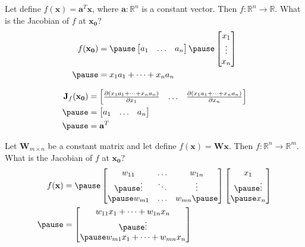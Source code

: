 \documentclass[12pt,aspectratio=169]{beamer}
\renewcommand{\Re}{\mathbb{R}}
\begin{document}
\begin{frame}
Let define $f(\mathbf{x})=\mathbf{a}^T\mathbf{x}$, where $\mathbf{a}:\Re^n$ is a constant vector. Then $f:\Re^n\to \Re$. What is the Jacobian of $f$ at $\mathbf{x_0}$?\pause
\[
\begin{aligned}
f(\mathbf{x_0})&=\pause
\begin{bmatrix}
a_1 & \dots & a_n
\end{bmatrix}\pause
\begin{bmatrix}
x_1 \\
\vdots\\
x_n
\end{bmatrix}\\ \pause
&=x_1a_1+\dots +x_na_n
\end{aligned}
\]
\end{frame}


\begin{frame}
\[
\begin{aligned}
\mathbf{J}_f(\mathbf{x_0})&=
\begin{bmatrix}
\frac{\partial (x_1a_1+\dots + x_na_n)}{\partial x_1} & \dots & \frac{\partial (x_1a_1+\dots + x_na_n)}{\partial x_n}\\ 
\end{bmatrix}\\ \pause
&=\begin{bmatrix}
a_1 & \dots & a_n
\end{bmatrix}\\ \pause
&=\mathbf{a}^T
\end{aligned}
\]
\end{frame}

\begin{frame}
Let $\mathbf{W}_{m\times n}$ be a constant matrix and let define $f(\mathbf{x})=\mathbf{W}\mathbf{x}$. Then $f:\Re^n\to \Re^m$. What is the Jacobian of $f$ at $\mathbf{x_0}$?
\[
\begin{aligned}
f(\mathbf{x})&=\pause\begin{bmatrix}
w_{11} & \dots & w_{1n}\\ \pause
\vdots & \ddots & \vdots\\ \pause
w_{m1} & \dots & w_{mn} \pause
\end{bmatrix}
\begin{bmatrix}
x_1\\ \pause
\vdots\\ \pause
x_n 
\end{bmatrix}\\ \pause
&=\begin{bmatrix}
w_{11}x_1+\dots + w_{1n}x_n\\ \pause
\vdots\\ \pause
w_{m1}x_1+\dots+w_{mn}x_n
\end{bmatrix}
\end{aligned}
\]
\end{frame}
\end{document}
